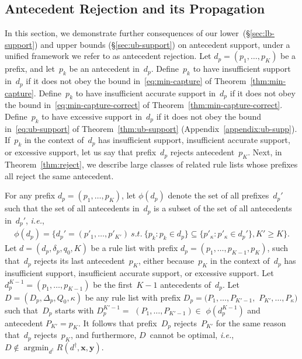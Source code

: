 \documentclass[twoside,11pt]{article}
\def\ie{{\it i.e.},~}
\newcommand{\x}{\mathbf{x}}
\newcommand{\y}{\mathbf{y}}
\def\RL{{d}}
\def\Prefix{d_p}
\def\Labels{\delta_p}
\def\Default{q_0}
\def\RLB{{D}}
\def\PrefixB{D_p}
\def\LabelsB{\Delta_p}
\def\DefaultB{Q_0}
\def\Obj{R}
\def\StartContains{\phi}
\DeclareMathOperator*{\argmin}{argmin}
\begin{document}
\begin{arxiv}
\subsection{Antecedent Rejection and its Propagation}
\label{sec:reject}

In this section, we demonstrate further consequences of
our lower~(\S\ref{sec:lb-support}) and upper
bounds (\S\ref{sec:ub-support}) on antecedent support,
under a unified framework we refer to as antecedent rejection.
%
Let ${\Prefix = (p_1, \dots, p_K)}$ be a prefix,
and let~$p_k$ be an antecedent in~$\Prefix$.
%
Define~$p_k$ to have insufficient support in~$\Prefix$
if it does not obey the bound in~\eqref{eq:min-capture}
of Theorem~\ref{thm:min-capture}.
%
Define~$p_k$ to have insufficient accurate support in~$\Prefix$
if it does not obey the bound in~\eqref{eq:min-capture-correct}
of Theorem~\ref{thm:min-capture-correct}.
%
Define~$p_k$ to have excessive support in~$\Prefix$
if it does not obey the bound in~\eqref{eq:ub-support}
of Theorem~\ref{thm:ub-support} (Appendix~\ref{appendix:ub-supp}).
%
If~$p_k$ in the context of~$\Prefix$ has insufficient support,
insufficient accurate support, or excessive support,
let us say that prefix~$\Prefix$ rejects antecedent~$p_K$.
%
Next, in Theorem~\ref{thm:reject}, we describe large classes of
related rule lists whose prefixes all reject the same antecedent.

\begin{theorem}
\label{thm:reject}
For any prefix ${\Prefix = (p_1, \dots, p_K)}$,
let $\StartContains(\Prefix)$ denote the set of all
prefixes~$\Prefix'$ such that
the set of all antecedents in~$\Prefix$ is a subset of
the set of all antecedents in~$\Prefix'$, \ie
\begin{align}
\StartContains(\Prefix) =
\{\Prefix' = (p'_1, \dots, p'_{K'})
~s.t.~ \{p_k : p_k \in \Prefix \} \subseteq
\{p'_\kappa : p'_\kappa \in \Prefix'\}, K' \ge K \}.
\label{eq:start-contains}
\end{align}
%
Let ${\RL = (\Prefix, \Labels, \Default, K)}$ be a rule list
with prefix ${\Prefix = (p_1, \dots, p_{K-1}, p_{K})}$,
such that~$\Prefix$ rejects its last antecedent~$p_{K}$,
either because~$p_{K}$ in the context of~$\Prefix$ has
insufficient support, insufficient accurate support,
or excessive support.
%
Let ${\Prefix^{K-1} = (p_1, \dots, p_{K-1})}$ be the
first~${K - 1}$ antecedents of~$\Prefix$.
%
Let ${\RLB = (\PrefixB, \LabelsB, \DefaultB, \kappa)}$
be any rule list with prefix
${\PrefixB = (P_1, \dots, P_{K'-1},}$ ${P_{K'}, \dots, P_{\kappa})}$
such that~$\PrefixB$ starts with ${\PrefixB^{K'-1} =}$
${(P_1, \dots, P_{K'-1}) \in}$ ${\StartContains(\Prefix^{K-1})}$
and antecedent ${P_{K'} = p_{K}}$.
%
It follows that prefix~$\PrefixB$ rejects~$P_{K'}$
for the same reason that~$\Prefix$ rejects~$p_{K}$,
and furthermore, $\RLB$~cannot be optimal, \ie
${\RLB \notin \argmin_{\RL^\dagger} \Obj(\RL^\dagger, \x, \y)}$.
\end{theorem}


\end{arxiv}
\end{document}
